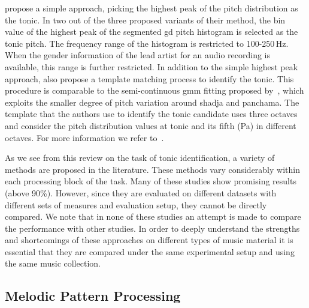 \cite{bellur2012knowledge} propose a simple approach, picking the highest peak of the pitch distribution as the tonic. In two out of the three proposed variants of their method, the bin value of the highest peak of the segmented \gls{gd} pitch histogram is selected as the tonic pitch. The frequency range of the histogram is restricted to 100-250\,Hz. When the gender information of the lead artist for an audio recording is available, this range is further restricted. In addition to the simple highest peak approach, \cite{bellur2012knowledge} also propose a template matching process to identify the tonic. This procedure is comparable to the semi-continuous \acrshort{gmm} fitting proposed by~\cite{ranjani2011carnatic}, which exploits the smaller degree of pitch variation around \gls{shadja} and \gls{panchama}. The template that the authors use to identify the tonic candidate uses three octaves and consider the pitch distribution values at tonic and its fifth (Pa) in different octaves. For more information we refer to~\cite{Gulati2014Tonic}.

As we see from this review on the task of tonic identification, a variety of methods are proposed in the literature. These methods vary considerably within each processing block of the task. Many of these studies show promising results (above 90\%). However, since they are evaluated on different datasets with different sets of measures and evaluation setup, they cannot be directly compared. We note that in none of these studies an attempt is made to compare the performance with other studies. In order to deeply understand the strengths and shortcomings of these approaches on different types of music material it is essential that they are compared under the same experimental setup and using the same music collection. 


\subsection{Melodic Pattern Processing}
\label{sec:sota_pattern_processing_iam}

